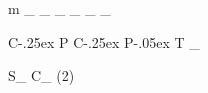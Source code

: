 \newmathsymbol{\DM}       {\Delta m}
\newmathsymbol{\DMs}      {\DM_{\squark}}
\newmathsymbol{\DMd}      {\DM_{\dquark}}
\newmathsymbol{\DG}       {\Delta\Gamma}
\newmathsymbol{\DGs}      {\DG_{\squark}}
\newmathsymbol{\DGd}      {\DG_{\dquark}}
\newmathsymbol{\Gs}       {\Gamma_{\squark}}
\newmathsymbol{\Gd}       {\Gamma_{\dquark}}


\newmathsymbol{\CP}               {C\kern-.25ex P}
\newmathsymbol{\CPT}              {C\kern-.25ex P\kern-.05ex T}
\newmathsymbol{\CPAsymmetry}      {_{\CP}}

\newmathsymbol{\SJpsiKS}      {S_{\jpsi\KS}}
\newmathsymbol{\CJpsiKS}      {C_{\jpsi\KS}}
\newmathsymbol{\sintwobeta}   {\sin(2\beta)}
